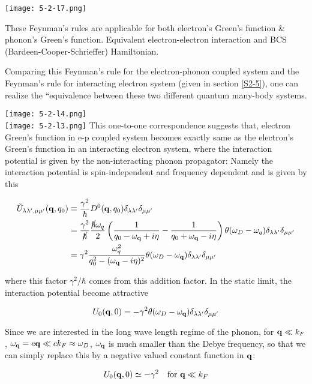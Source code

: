 \texttt{[image: 5-2-l7.png]}

These Feynman's rules are applicable for both electron's Green's function \& phonon's Green's function. Equivalent electron-electron interaction and BCS (Bardeen-Cooper-Schrieffer) Hamiltonian.

Comparing this Feynman's rule for the electron-phonon coupled system and the Feynman's rule for interacting electron system (given in section \ref{S2-5}), one can realize the ``equivalence between these two different quantum many-body systems.

\newpage
\texttt{[image: 5-2-l4.png]}\\
\texttt{[image: 5-2-l3.png]}
\newpage
This one-to-one correspondence suggests that, electron Green's function in e-p coupled system becomes exactly same as the electron's Green's function in an interacting electron system, where the interaction potential is given by the non-interacting phonon propagator: Namely the interaction potential is spin-independent and frequency dependent and is given by this

\[\begin{split}
\tilde{U}_{\lambda\lambda',\mu\mu'}({\bf q},q_0)&\equiv\frac{\gamma^2}{\hbar}D^0({\bf q},q_0)\delta_{\lambda\lambda'}\delta_{\mu\mu'}\\
&=\frac{\gamma^2}{\cancel\hbar}\frac{\cancel{\hbar}\omega_q}{2}\left(\frac{1}{q_0-\omega_{\bf q}+i\eta} - \frac{1}{q_0+\omega_{\bf q}-i\eta}\right)\theta(\omega_D-\omega_q)\delta_{\lambda\lambda'}\delta_{\mu\mu'}\\
&=\gamma^2\frac{\omega_q^2}{q_0^2-(\omega_{\bf q}-i\eta)^2}\theta(\omega_D-\omega_{\bf q})\delta_{\lambda\lambda'}\delta_{\mu\mu'}
\end{split} \]

where this factor $\gamma^2/\hbar$ comes from this addition factor. In the static limit, the interaction potential become attractive

\[ U_0({\bf q},0) = -\gamma^2\theta(\omega_D-\omega_{\bf q})\delta_{\lambda\lambda'}\delta_{\mu\mu'}\]

Since we are interested in the long wave length regime of the phonon, for ${\bf q}\ll k_F$, $\omega_{\bf q} = e{\bf q} \ll ck_F\approx\omega_D$, $\omega_{\bf q}$ is much smaller than the Debye frequency, so that we can simply replace this by a negative valued constant function in $\bf q$:

\[U_0({\bf q},0)\simeq -\gamma^2\quad\text{for }{\bf q}\ll k_F \]

